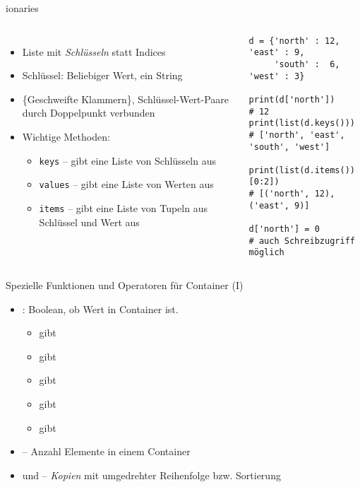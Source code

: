 \begin{frame}[fragile]{ionaries}
%
\begin{columns}[T]
\begin{itemize}
\item Liste mit \emph{Schlüsseln} statt Indices
\item Schlüssel: Beliebiger Wert, \zB ein String
\item \{Geschweifte Klammern\}, Schlüssel-Wert-Paare durch Doppelpunkt verbunden
\item Wichtige Methoden:
	\begin{itemize}
	\item \texttt{keys} -- gibt eine Liste von Schlüsseln aus
	\item \texttt{values} -- gibt eine Liste von Werten aus
	\item \texttt{items} -- gibt eine Liste von Tupeln aus Schlüssel und Wert aus
	\end{itemize}
\end{itemize}
%
\begin{codebox}
\begin{verbatim}
d = {'north' : 12, 'east' : 9,
     'south' :  6, 'west' : 3}

print(d['north'])      # 12
print(list(d.keys()))
# ['north', 'east', 'south', 'west']

print(list(d.items())[0:2])
# [('north', 12), ('east', 9)]

d['north'] = 0
# auch Schreibzugriff möglich
\end{verbatim}
\end{codebox}
\end{columns}
%
\end{frame}


\begin{frame}[fragile]{Spezielle Funktionen und Operatoren für Container (I)}
%
\begin{itemize}
\item {}: Boolean, ob Wert in Container ist.
	\begin{itemize}
	\item \inPy{1 in [1, 2, 3]} gibt 
	\item {} gibt 
	\item {} gibt 
	\item {} gibt 
	\item {} gibt 
	\end{itemize}
\item {} -- Anzahl Elemente in einem Container
\item {} und  -- \emph{Kopien} mit umgedrehter Reihenfolge bzw. Sortierung
\end{itemize}
%
\end{frame}


